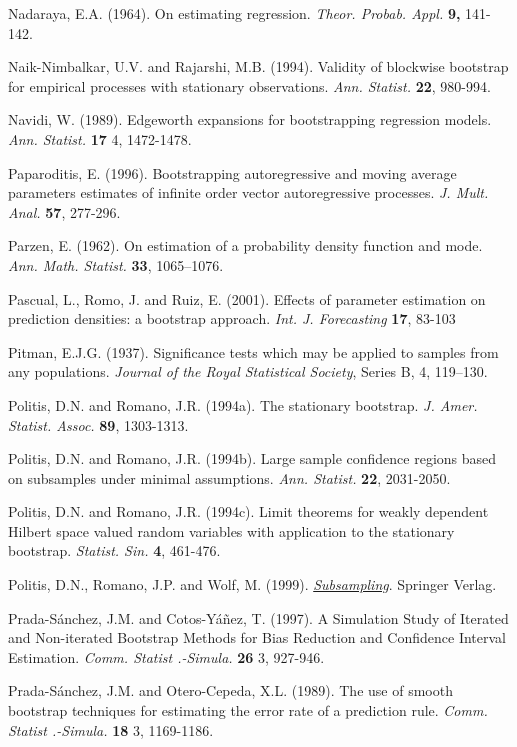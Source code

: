 \documentclass[
]{book}
\theoremstyle{break}
\theoremstyle{definition}
\theoremstyle{definition}
\theoremstyle{definition}
\theoremstyle{definition}
\theoremstyle{remark}
\begin{document}
Nadaraya, E.A. (1964). On estimating regression. \emph{Theor. Probab. Appl.}
\textbf{9,} 141-142.

Naik-Nimbalkar, U.V. and Rajarshi, M.B. (1994). Validity of blockwise
bootstrap for empirical processes with stationary observations.
\emph{Ann. Statist.} \textbf{22}, 980-994.

Navidi, W. (1989). Edgeworth expansions for bootstrapping regression
models. \emph{Ann. Statist.} \textbf{17} 4, 1472-1478.

Paparoditis, E. (1996). Bootstrapping autoregressive and moving average
parameters estimates of infinite order vector autoregressive processes.
\emph{J. Mult. Anal.} \textbf{57}, 277-296.

Parzen, E. (1962). On estimation of a probability density function and
mode. \emph{Ann. Math. Statist.} \textbf{33}, 1065--1076.

Pascual, L., Romo, J. and Ruiz, E. (2001). Effects of parameter
estimation on prediction densities: a bootstrap approach.
\emph{Int. J. Forecasting} \textbf{17}, 83-103

Pitman, E.J.G. (1937). Significance tests which may be applied to samples from any populations. \emph{Journal of the Royal Statistical Society}, Series B, 4, 119--130.

Politis, D.N. and Romano, J.R. (1994a). The stationary bootstrap.
\emph{J. Amer. Statist. Assoc.} \textbf{89}, 1303-1313.

Politis, D.N. and Romano, J.R. (1994b). Large sample confidence regions
based on subsamples under minimal assumptions. \emph{Ann. Statist.} \textbf{22},
2031-2050.

Politis, D.N. and Romano, J.R. (1994c). Limit theorems for weakly
dependent Hilbert space valued random variables with application to the
stationary bootstrap. \emph{Statist. Sin.} \textbf{4}, 461-476.

Politis, D.N., Romano, J.P. and Wolf, M. (1999). \href{https://books.google.es/books?hl=es\&lr=\&id=nGu6rqjE6JoC\&oi=fnd\&pg=PR7\&dq=Subsampling}{\emph{Subsampling}}.
Springer Verlag.

Prada-Sánchez, J.M. and Cotos-Yáñez, T. (1997). A Simulation Study of
Iterated and Non-iterated Bootstrap Methods for Bias Reduction and
Confidence Interval Estimation. \emph{Comm. Statist .-Simula.} \textbf{26} 3, 927-946.

Prada-Sánchez, J.M. and Otero-Cepeda, X.L. (1989). The use of smooth
bootstrap techniques for estimating the error rate of a prediction rule.
\emph{Comm. Statist .-Simula.} \textbf{18} 3, 1169-1186.
\end{document}
